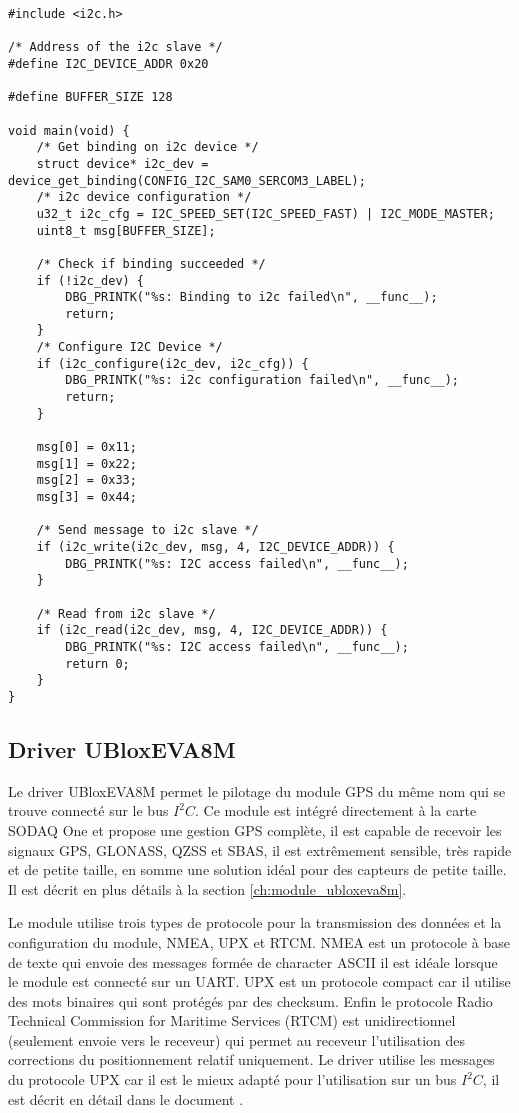 \begin{lstlisting}[style=CStyle]
#include <i2c.h>

/* Address of the i2c slave */
#define I2C_DEVICE_ADDR 0x20

#define BUFFER_SIZE 128

void main(void) {
	/* Get binding on i2c device */
	struct device* i2c_dev = device_get_binding(CONFIG_I2C_SAM0_SERCOM3_LABEL);
	/* i2c device configuration */
	u32_t i2c_cfg = I2C_SPEED_SET(I2C_SPEED_FAST) | I2C_MODE_MASTER;
	uint8_t msg[BUFFER_SIZE];
	
	/* Check if binding succeeded */
	if (!i2c_dev) {
		DBG_PRINTK("%s: Binding to i2c failed\n", __func__);
		return;
	}
	/* Configure I2C Device */
	if (i2c_configure(i2c_dev, i2c_cfg)) {
		DBG_PRINTK("%s: i2c configuration failed\n", __func__);
		return;
	}	
	
	msg[0] = 0x11;
	msg[1] = 0x22;
	msg[2] = 0x33;
	msg[3] = 0x44;	
	
	/* Send message to i2c slave */
	if (i2c_write(i2c_dev, msg, 4, I2C_DEVICE_ADDR)) {
		DBG_PRINTK("%s: I2C access failed\n", __func__);
	}
	
	/* Read from i2c slave */
	if (i2c_read(i2c_dev, msg, 4, I2C_DEVICE_ADDR)) {
		DBG_PRINTK("%s: I2C access failed\n", __func__);
		return 0;
	}	
}
\end{lstlisting}

\subsection{Driver UBloxEVA8M}

Le driver UBloxEVA8M permet le pilotage du module GPS du même nom qui se trouve connecté sur le bus $I^{2}C$. Ce module est intégré directement à la carte SODAQ One et propose une gestion GPS complète, il est capable de recevoir les signaux GPS, GLONASS, QZSS et SBAS, il est extrêmement sensible, très rapide et de petite taille, en somme une solution idéal pour des capteurs de petite taille. Il est décrit en plus détails à la section \ref{ch:module_ubloxeva8m}. 

Le module utilise trois types de protocole pour la transmission des données et la configuration du module, NMEA, UPX et RTCM. NMEA est un protocole à base de texte qui envoie des messages formée de character ASCII il est idéale lorsque le module est connecté sur un UART. UPX est un protocole compact car il utilise des mots binaires qui sont protégés par des checksum. Enfin le protocole Radio Technical Commission for Maritime Services (RTCM) est unidirectionnel (seulement envoie vers le receveur) qui permet au receveur l'utilisation des corrections du positionnement relatif uniquement.
Le driver utilise les messages du protocole UPX car il est le mieux adapté pour l'utilisation sur un bus $I^{2}C$, il est décrit en détail dans le document \cite{ublox-protocol}.

